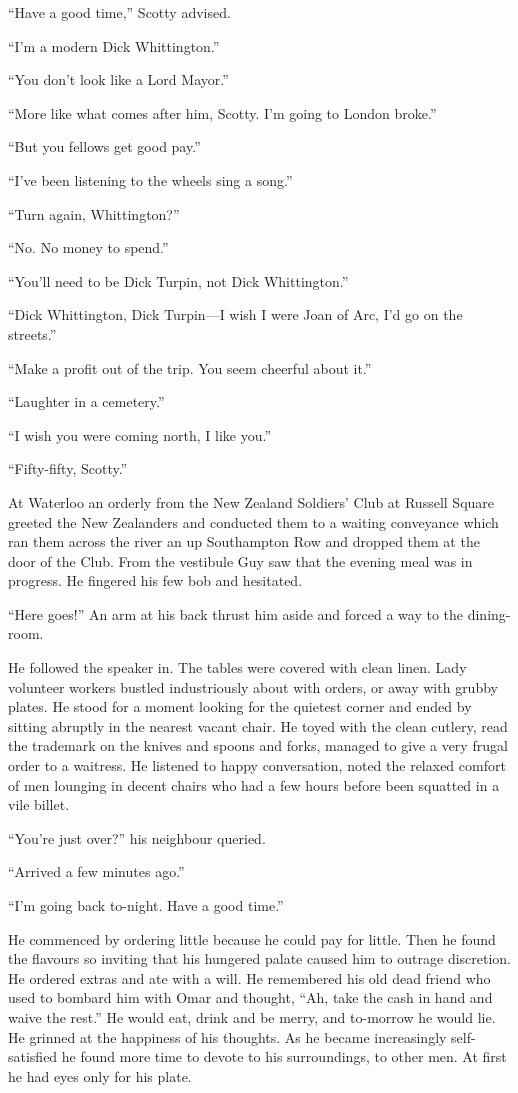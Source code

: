 ``Have a good time,'' Scotty advised.

``I'm a modern Dick Whittington.''

``You don't look like a Lord Mayor.''

``More like what comes after him, Scotty. I'm going to London broke.''

``But you fellows get good pay.''

``I've been listening to the wheels sing a song.''

``Turn again, Whittington?''

``No. No money to spend.''

``You'll need to be Dick Turpin, not Dick Whittington.''

``Dick Whittington, Dick Turpin---I wish I were Joan of Arc, I'd go on the streets.''

``Make a profit out of the trip. You seem cheerful about it.''

``Laughter in a cemetery.''

``I wish you were coming north, I like you.''

``Fifty-fifty, Scotty.''

At Waterloo an orderly from the New Zealand Soldiers' Club at Russell Square greeted the New Zealanders and conducted them to a waiting conveyance which ran them across the river an up Southampton Row and dropped them at the door of the Club. From the vestibule Guy saw that the evening meal was in progress. He fingered his few bob and hesitated.

``Here goes!'' An arm at his back thrust him aside and forced a way to the dining-room.

He followed the speaker in. The tables were covered with clean linen. Lady volunteer workers bustled industriously about with orders, or away with grubby plates. He stood for a moment looking for the quietest corner and ended by sitting abruptly in the nearest vacant chair. He toyed with the clean cutlery, read the trademark on the knives and spoons and forks, managed to give a very frugal order to a waitress. He listened to happy conversation, noted the relaxed comfort of men lounging in decent chairs who had a few hours before been squatted in a vile billet.

``You're just over?'' his neighbour queried.

``Arrived a few minutes ago.''

``I'm going back to-night. Have a good time.''

He commenced by ordering little because he could pay for little. Then he found the flavours so inviting that his hungered palate caused him to outrage discretion. He ordered extras and ate with a will. He remembered his old dead friend who used to bombard him with Omar and thought, ``Ah, take the cash in hand and waive the rest.'' He would eat, drink and be merry, and to-morrow he would lie. He grinned at the happiness of his thoughts. As he became increasingly self-satisfied he found more time to devote to his surroundings, to other men. At first he had eyes only for his plate.

